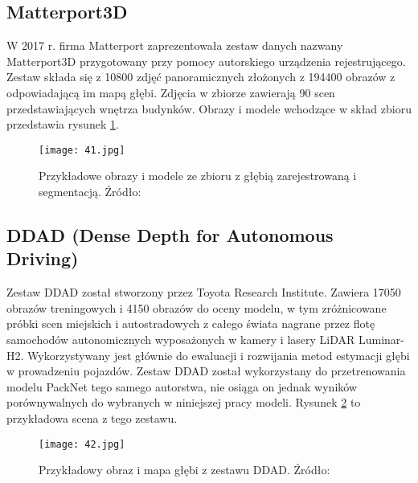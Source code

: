 \subsection{Matterport3D}
W 2017 r. firma Matterport zaprezentowała zestaw danych nazwany Matterport3D \cite{chang2017} przygotowany przy pomocy autorskiego urządzenia rejestrującego. Zestaw składa się z 10800 zdjęć panoramicznych złożonych z 194400 obrazów z odpowiadającą im mapą głębi. Zdjęcia w zbiorze zawierają 90 scen przedstawiających wnętrza budynków. Obrazy i modele wchodzące w skład zbioru przedstawia rysunek \ref{fig:matterport3d-example}.
\begin{figure}[H]
    \centering
    \texttt{[image: 41.jpg]}
    \caption{Przykładowe obrazy i modele ze zbioru z głębią zarejestrowaną i segmentacją. Źródło: \cite{chang2017}}
    \label{fig:matterport3d-example}
\end{figure} 

\subsection{DDAD (Dense Depth for Autonomous Driving)}
Zestaw DDAD \cite{guizilini2020} został stworzony przez Toyota Research Institute. Zawiera 17050 obrazów treningowych i 4150 obrazów do oceny modelu, w tym zróżnicowane próbki scen miejskich i autostradowych z całego świata nagrane przez flotę samochodów autonomicznych wyposażonych w kamery i lasery LiDAR Luminar-H2. Wykorzystywany jest głównie do ewaluacji i rozwijania metod estymacji głębi w prowadzeniu pojazdów. Zestaw DDAD został wykorzystany do przetrenowania modelu PackNet tego samego autorstwa, nie osiąga on jednak wyników porównywalnych do wybranych w niniejszej pracy modeli.
Rysunek \ref{fig:ddad-example} to przykładowa scena z tego zestawu.
\begin{figure}[H]
    \centering
    \texttt{[image: 42.jpg]}
    \caption{Przykładowy obraz i mapa głębi z zestawu DDAD. Źródło: \cite{guizilini2020}}
    \label{fig:ddad-example}
\end{figure} 

